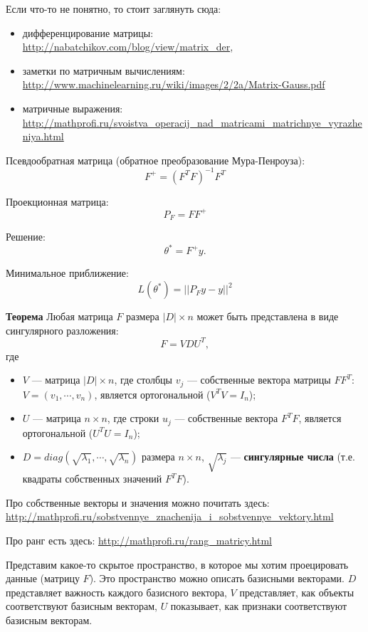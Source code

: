 Если что-то не понятно, то стоит заглянуть сюда:
\begin{itemize}
    \item дифференцирование матрицы:
        \url{http://nabatchikov.com/blog/view/matrix_der},
    \item заметки по матричным вычислениям:
        \url{http://www.machinelearning.ru/wiki/images/2/2a/Matrix-Gauss.pdf}
    \item матричные выражения:
        \url{http://mathprofi.ru/svoistva_operacij_nad_matricami_matrichnye_vyrazheniya.html}
\end{itemize}


Псевдообратная матрица (обратное преобразование Мура-Пенроуза):
\[
    F^+ = (F^T F)^{-1} F^T
\]

Проекционная матрица:
\[
    P_{F} = F F^+
\]

Решение:
\[
    \theta^* = F^+ y.
\]

Минимальное приближение:
\[
    L(\theta^*) = ||P_F y - y ||^2
\]

\textbf{Теорема} Любая матрица $F$ размера $|D|\times n$ может быть представлена
в виде сингулярного разложения:
\[
    F = V D U^T,
\] 
где
\begin{itemize}
    \item $V$ --- матрица $|D| \times n$, где столбцы $v_j$ --- собственные вектора
        матрицы $FF^T$: $V = (v_1, \cdots, v_n)$, является ортогональной ($V^TV
        = I_n$);

    \item $U$ --- матрица $n \times n$, где строки $u_j$ --- собственные
        вектора $F^TF$, является ортогональной ($U^T U = I_n$);

    \item $D = diag(\sqrt{\lambda_1}, \cdots, \sqrt{\lambda_n})$ размера $n
        \times n$, $\sqrt{\lambda_j}$ --- \textbf{сингулярные числа} (т.е. квадраты
        собственных значений $F^T F$).
\end{itemize}

Про собственные векторы и значения можно почитать здесь:
\url{http://mathprofi.ru/sobstvennye_znachenija_i_sobstvennye_vektory.html}

Про ранг есть здесь:
\url{http://mathprofi.ru/rang_matricy.html}

Представим какое-то скрытое пространство, в которое мы хотим проецировать
данные (матрицу $F$). Это пространство можно описать базисными векторами. 
$D$ представляет важность каждого базисного вектора, $V$ представляет,
как объекты соответствуют базисным векторам, $U$ показывает, как признаки
соответствуют базисным векторам.

